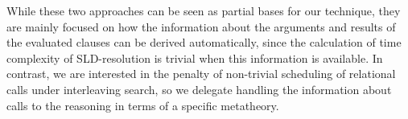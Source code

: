 While these two approaches can be seen as partial bases for our technique, they are mainly focused on how the information about the arguments and results of
the evaluated clauses can be derived automatically, since the calculation of time complexity of \textsc{SLD}-resolution is trivial when this information is available.
In contrast, we are interested in the penalty of non-trivial scheduling of relational calls under interleaving search, so we delegate handling the information
about calls to the reasoning in terms of a specific metatheory.


